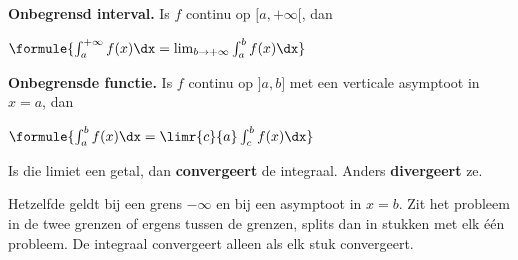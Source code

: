 \begin{theorie}
\begin{minipage}[t]{.65\linewidth}
\textbf{\textcolor{accent}{Onbegrensd interval.}} Is $f$ continu op $[a, +\infty[$, dan

\vspace{1mm}
\qquad $\formule{\int_a^{+\infty} f(x)\dx = \lim_{b \to +\infty} \int_a^b f(x)\dx}$

\vspace{1.5mm}
\textbf{\textcolor{accent}{Onbegrensde functie.}} Is $f$ continu op $]a, b]$ met een verticale asymptoot in $x = a$, dan

\vspace{1mm}
\qquad $\formule{\int_a^b f(x)\dx = \limr{c}{a} \int_c^b f(x)\dx}$
\end{minipage}\hfill
\begin{minipage}[t]{.31\linewidth}
\vspace{-1mm}
\end{minipage}

\vspace{1.5mm}
Is die limiet een getal, dan \textbf{\textcolor{accent}{convergeert}} de integraal. Anders \textbf{\textcolor{accent}{divergeert}} ze.

\vspace{1mm}
Hetzelfde geldt bij een grens $-\infty$ en bij een asymptoot in $x = b$. Zit het probleem in de twee grenzen of ergens tussen de grenzen, splits dan in stukken met elk één probleem. De integraal convergeert alleen als elk stuk convergeert.
\end{theorie}


